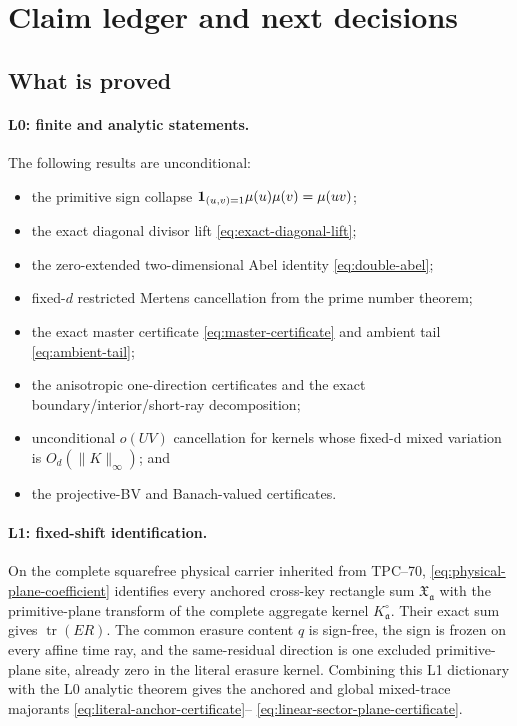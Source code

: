 \section{Claim ledger and next decisions}
\label{sec:claim-ledger}

\subsection{What is proved}

\paragraph{L0: finite and analytic statements.}
The following results are unconditional:
\begin{itemize}
 \item the primitive sign collapse
 \(\mathbf 1_{(u,v)=1}\mu(u)\mu(v)=\mu(uv)\);
 \item the exact diagonal divisor lift
 \eqref{eq:exact-diagonal-lift};
 \item the zero-extended two-dimensional Abel identity
 \eqref{eq:double-abel};
 \item fixed-\(d\) restricted Mertens cancellation from the prime number
 theorem;
 \item the exact master certificate
 \eqref{eq:master-certificate} and ambient tail
 \eqref{eq:ambient-tail};
 \item the anisotropic one-direction certificates and the exact
 boundary/interior/short-ray decomposition;
 \item unconditional \(o(UV)\) cancellation for kernels whose fixed-d
 mixed variation is \(O_d(\|K\|_\infty)\); and
 \item the projective-BV and Banach-valued certificates.
\end{itemize}

\paragraph{L1: fixed-shift identification.}
On the complete squarefree physical carrier inherited from TPC--70,
\eqref{eq:physical-plane-coefficient} identifies every anchored cross-key
rectangle sum \(\mathfrak X_{\mathfrak a}\) with the primitive-plane
transform of the complete aggregate kernel \(K^\circ_{\mathfrak a}\).
Their exact sum gives \(\operatorname{tr}(ER)\).  The common erasure
content \(q\) is sign-free, the sign is frozen on every affine time ray,
and the same-residual direction is one excluded primitive-plane site,
already zero in the literal erasure kernel.
Combining this L1 dictionary with the L0 analytic theorem gives the
anchored and global mixed-trace majorants
\eqref{eq:literal-anchor-certificate}--%
\eqref{eq:linear-sector-plane-certificate}.

